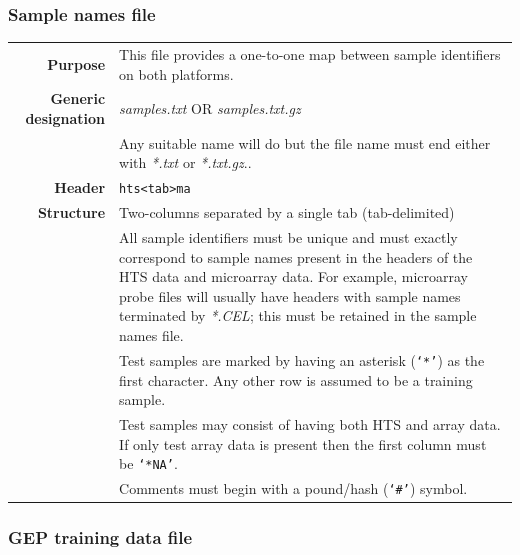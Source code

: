 \documentclass[a4paper,12pt]{article}
\begin{document}
\subsubsection{Sample names file}
\label{tiep:sample}

\begin{tabular}{rp{12cm}}
\textbf{Purpose} & This file provides a one-to-one map between sample identifiers on both platforms. \\
\textbf{Generic designation} & \textit{samples.txt} OR \textit{samples.txt.gz} \\
   & Any suitable name will do but the file name must end either with \textit{*.txt} or \textit{*.txt.gz}.. \\
\textbf{Header} & \texttt{hts\textless tab\textgreater ma} \\
\textbf{Structure} & Two-columns separated by a single tab (tab-delimited) \\
  & All sample identifiers must be unique and must exactly correspond to sample names present in the headers of the HTS data and microarray data. For example, microarray probe files will usually have headers with sample names terminated by \textit{*.CEL}; this must be retained in the sample names file. \\
  & Test samples are marked by having an asterisk (\texttt{`*'}) as the first character. Any other row is assumed to be a training sample. \\
  & Test samples may consist of having both HTS and array data. If only test array data is present then the first column must be \texttt{`*NA'}. \\
  & Comments must begin with a pound/hash (\texttt{`\#'}) symbol. \\
\end{tabular}

\subsubsection{GEP training data file}
\label{tiep:gep_train}
\end{document}
